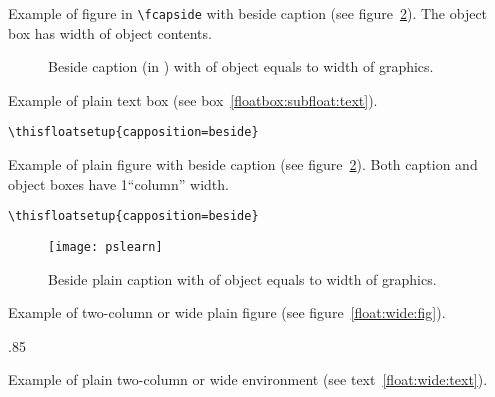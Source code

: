 \clearpage
Example of figure in \verb|\fcapside| with beside caption (see figure~\ref{floatbox:beside:figI}).
The object box has width of object contents.
\begin{figure}
{\caption{Beside caption (in \protect{}) with of object equals to width of
graphics. \text}%
\label{floatbox:beside:figI}}
\end{figure}

\Text

\clearpage
Example of plain text box (see box~\ref{floatbox:subfloat:text}).
\begin{verbatim}
\thisfloatsetup{capposition=beside}
\end{verbatim}
\begin{textbox}
{\TEXTBOX}
{\caption{Beside plain caption. \text}%
\label{floatbox:beside:text}}
\end{textbox}


\Text

\clearpage
Example of plain figure with beside caption (see figure~\ref{floatbox:beside:figI}).
Both caption and object boxes have 1``column'' width.
\begin{verbatim}
\thisfloatsetup{capposition=beside}
\end{verbatim}
\begin{figure}
{\texttt{[image: pslearn]}}
{\caption{Beside plain caption with of object equals to width of
graphics. \text}%
\label{floatbox:beside:figI}}
\end{figure}

\Text

\fi

\ifWideLayout
\clearpage
Example of two-column or wide plain figure (see figure~\ref{float:wide:fig}).

\begin{figure*}
  {\unitlength.85\unitlength\ifx\pspicture\undefined\else{}\fi
  }%
  \caption{%
Plain wide figure. \text }%
\label{float:wide:fig}%
\end{figure*}

\Text

\clearpage
Example of plain two-column or wide  environment
(see text~\ref{float:wide:text}).

\begin{textbox*}
\TEXTBOX
  \caption{Plain wide textbox. \text }%
\label{float:wide:text}%
\end{textbox*}

